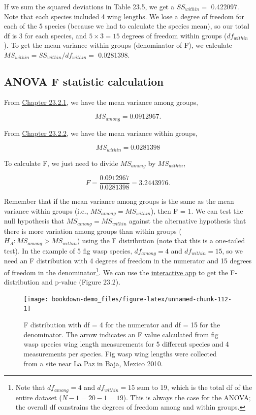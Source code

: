 \documentclass[
]{scrbook}
\begin{document}
If we sum the squared deviations in Table 23.5, we get a \(SS_{within} =\) 0.422097.
Note that each species included 4 wing lengths.
We lose a degree of freedom for each of the 5 species (because we had to calculate the species mean), so our total df is 3 for each species, and \(5 \times 3 = 15\) degrees of freedom within groups (\(df_{within}\)).
To get the mean variance within groups (denominator of F), we calculate \(MS_{within} = SS_{within} / df_{within} =\) 0.0281398.

\hypertarget{anova-f-statistic-calculation}{%
\subsection{ANOVA F statistic calculation}\label{anova-f-statistic-calculation}}

From \protect\hyperlink{anova-mean-variance-among-groups}{Chapter 23.2.1}, we have the mean variance among groups,

\[MS_{among} = 0.0912967.\]

From \protect\hyperlink{anova-mean-variance-among-groups}{Chapter 23.2.2}, we have the mean variance within groups,

\[MS_{within} = 0.0281398\]

To calculate F, we just need to divide \(MS_{among}\) by \(MS_{within}\),

\[F = \frac{0.0912967}{0.0281398} = 3.2443976.\]

Remember that if the mean variance among groups is the same as the mean variance within groups (i.e., \(MS_{among} = MS_{within}\)), then F = 1.
We can test the null hypothesis that \(MS_{among} = MS_{within}\) against the alternative hypothesis that there is more variation among groups than within groups (\(H_{A}: MS_{among} > MS_{within}\)) using the F distribution (note that this is a one-tailed test).
In the example of 5 fig wasp species, \(df_{among} = 4\) and \(df_{within} = 15\),
so we need an F distribution with 4 degrees of freedom in the numerator and 15 degrees of freedom in the denominator\footnote{Note that \(df_{among} = 4\) and \(df_{within} = 15\) sum to 19, which is the total df of the entire dataset (\(N - 1 = 20 - 1 = 19\)). This is always the case for the ANOVA; the overall df constrains the degrees of freedom among and within groups.}.
We can use the \href{https://bradduthie.shinyapps.io/f_distribution/}{interactive app} to get the F-distribution and p-value (Figure 23.2).

\begin{figure}
\texttt{[image: bookdown-demo\_files/figure-latex/unnamed-chunk-112-1]} \caption{F distribution with df = 4 for the numerator and df = 15 for the denominator. The arrow indicates an F value calculated from fig wasp species wing length measurements for 5 different species and 4 measurements per species. Fig wasp wing lengths were collected from a site near La Paz in Baja, Mexico 2010.}\label{fig:unnamed-chunk-112}
\end{figure}
\end{document}
